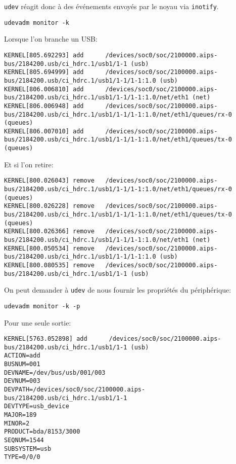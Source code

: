 \documentclass[compress,aspectratio=169]{beamer}
\begin{document}
\begin{frame}[fragile]
\texttt{udev} réagit donc à des événements envoyés par le noyau via \texttt{inotify}.

\begin{lstlisting}[style=shell]
udevadm monitor -k
\end{lstlisting}
Lorsque l'on branche un USB:
\begin{lstlisting}[style=shell,basicstyle=\tiny\ttfamily\color{white}]
KERNEL[805.692293] add      /devices/soc0/soc/2100000.aips-bus/2184200.usb/ci_hdrc.1/usb1/1-1 (usb)
KERNEL[805.694999] add      /devices/soc0/soc/2100000.aips-bus/2184200.usb/ci_hdrc.1/usb1/1-1/1-1:1.0 (usb)
KERNEL[806.006810] add      /devices/soc0/soc/2100000.aips-bus/2184200.usb/ci_hdrc.1/usb1/1-1/1-1:1.0/net/eth1 (net)
KERNEL[806.006948] add      /devices/soc0/soc/2100000.aips-bus/2184200.usb/ci_hdrc.1/usb1/1-1/1-1:1.0/net/eth1/queues/rx-0 (queues)
KERNEL[806.007010] add      /devices/soc0/soc/2100000.aips-bus/2184200.usb/ci_hdrc.1/usb1/1-1/1-1:1.0/net/eth1/queues/tx-0 (queues)
\end{lstlisting}
Et si l'on retire:
\begin{lstlisting}[style=shell,basicstyle=\tiny\ttfamily\color{white}]
KERNEL[800.026043] remove   /devices/soc0/soc/2100000.aips-bus/2184200.usb/ci_hdrc.1/usb1/1-1/1-1:1.0/net/eth1/queues/rx-0 (queues)
KERNEL[800.026228] remove   /devices/soc0/soc/2100000.aips-bus/2184200.usb/ci_hdrc.1/usb1/1-1/1-1:1.0/net/eth1/queues/tx-0 (queues)
KERNEL[800.026366] remove   /devices/soc0/soc/2100000.aips-bus/2184200.usb/ci_hdrc.1/usb1/1-1/1-1:1.0/net/eth1 (net)
KERNEL[800.050534] remove   /devices/soc0/soc/2100000.aips-bus/2184200.usb/ci_hdrc.1/usb1/1-1/1-1:1.0 (usb)
KERNEL[800.080535] remove   /devices/soc0/soc/2100000.aips-bus/2184200.usb/ci_hdrc.1/usb1/1-1 (usb)
\end{lstlisting}
\end{frame}

\begin{frame}[fragile]
On peut demander à \texttt{udev} de nous fournir les propriétés du périphérique:
\begin{lstlisting}[basicstyle=\tiny\ttfamily\color{white}]
udevadm monitor -k -p
\end{lstlisting}
Pour une seule sortie:
\begin{lstlisting}[style=shell,basicstyle=\tiny\ttfamily\color{white}]
KERNEL[5763.052898] add      /devices/soc0/soc/2100000.aips-bus/2184200.usb/ci_hdrc.1/usb1/1-1 (usb)
ACTION=add
BUSNUM=001
DEVNAME=/dev/bus/usb/001/003
DEVNUM=003
DEVPATH=/devices/soc0/soc/2100000.aips-bus/2184200.usb/ci_hdrc.1/usb1/1-1
DEVTYPE=usb_device
MAJOR=189
MINOR=2
PRODUCT=bda/8153/3000
SEQNUM=1544
SUBSYSTEM=usb
TYPE=0/0/0
\end{lstlisting}
\end{frame}
\end{document}
